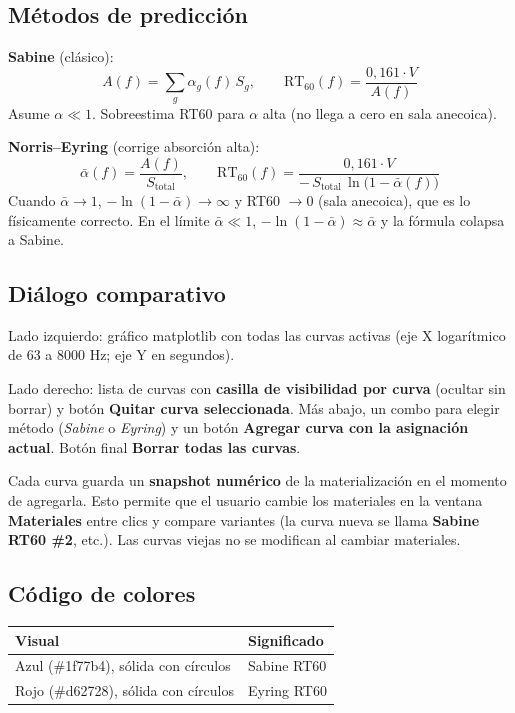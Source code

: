 \documentclass[11pt, a4paper]{article}
\newcommand{\menu}[1]{\textbf{\guillemotleft #1\guillemotright}}
\begin{document}
\subsection{Métodos de predicción}

\textbf{Sabine} (clásico):
\[
  A(f) = \sum_g \alpha_g(f)\, S_g, \qquad
  \text{RT}_{60}(f) = \frac{0{,}161 \cdot V}{A(f)}
\]
Asume $\alpha \ll 1$. Sobreestima RT60 para $\alpha$ alta (no llega a cero
en sala anecoica).

\textbf{Norris--Eyring} (corrige absorción alta):
\[
  \bar{\alpha}(f) = \frac{A(f)}{S_\text{total}}, \qquad
  \text{RT}_{60}(f) = \frac{0{,}161 \cdot V}{-\,S_\text{total}\,\ln\bigl(1-\bar{\alpha}(f)\bigr)}
\]
Cuando $\bar{\alpha} \to 1$, $-\ln(1-\bar{\alpha}) \to \infty$ y RT60 $\to 0$
(sala anecoica), que es lo físicamente correcto. En el límite
$\bar{\alpha} \ll 1$, $-\ln(1-\bar{\alpha}) \approx \bar{\alpha}$ y la
fórmula colapsa a Sabine.

\subsection{Diálogo comparativo}

Lado izquierdo: gráfico matplotlib con todas las curvas activas
(eje X logarítmico de 63 a 8000 Hz; eje Y en segundos).

Lado derecho: lista de curvas con \textbf{casilla de visibilidad por
curva} (ocultar sin borrar) y botón \menu{Quitar curva seleccionada}.
Más abajo, un combo para elegir método (\textit{Sabine} o
\textit{Eyring}) y un botón \menu{Agregar curva con la asignación
actual}. Botón final \menu{Borrar todas las curvas}.

Cada curva guarda un \textbf{snapshot numérico} de la materialización
en el momento de agregarla. Esto permite que el usuario cambie los
materiales en la ventana \menu{Materiales} entre clics y compare
variantes (la curva nueva se llama \menu{Sabine RT60 \#2}, etc.). Las
curvas viejas no se modifican al cambiar materiales.

\subsection{Código de colores}

\begin{tabular}{ll}
  \toprule
  Visual & Significado \\
  \midrule
  Azul (\#1f77b4), sólida con círculos & Sabine RT60 \\
  Rojo (\#d62728), sólida con círculos & Eyring RT60 \\
  \bottomrule
\end{tabular}
\end{document}
